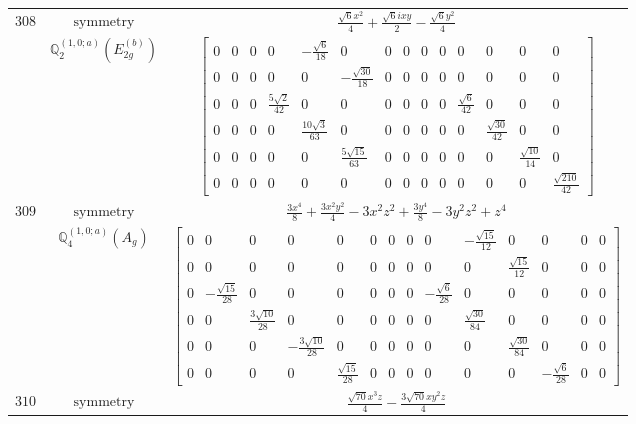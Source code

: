 \documentclass[fleqn,8pt,landscape]{jsarticle}
\begin{document}
\begin{longtable}{ccc}
$ 308 $ & $ \text{symmetry} $ & $ \frac{\sqrt{6} x^{2}}{4} + \frac{\sqrt{6} i x y}{2} - \frac{\sqrt{6} y^{2}}{4} $ \\
$  $ & $ \mathbb{Q}_{2}^{(1,0;a)}(E_{2g}^{(b)}) $ & $ \begin{bmatrix} 0 & 0 & 0 & 0 & - \frac{\sqrt{6}}{18} & 0 & 0 & 0 & 0 & 0 & 0 & 0 & 0 & 0 \\ 0 & 0 & 0 & 0 & 0 & - \frac{\sqrt{30}}{18} & 0 & 0 & 0 & 0 & 0 & 0 & 0 & 0 \\ 0 & 0 & 0 & \frac{5 \sqrt{2}}{42} & 0 & 0 & 0 & 0 & 0 & 0 & \frac{\sqrt{6}}{42} & 0 & 0 & 0 \\ 0 & 0 & 0 & 0 & \frac{10 \sqrt{3}}{63} & 0 & 0 & 0 & 0 & 0 & 0 & \frac{\sqrt{30}}{42} & 0 & 0 \\ 0 & 0 & 0 & 0 & 0 & \frac{5 \sqrt{15}}{63} & 0 & 0 & 0 & 0 & 0 & 0 & \frac{\sqrt{10}}{14} & 0 \\ 0 & 0 & 0 & 0 & 0 & 0 & 0 & 0 & 0 & 0 & 0 & 0 & 0 & \frac{\sqrt{210}}{42} \end{bmatrix} $ \\ \hline
$ 309 $ & $ \text{symmetry} $ & $ \frac{3 x^{4}}{8} + \frac{3 x^{2} y^{2}}{4} - 3 x^{2} z^{2} + \frac{3 y^{4}}{8} - 3 y^{2} z^{2} + z^{4} $ \\
$  $ & $ \mathbb{Q}_{4}^{(1,0;a)}(A_{g}) $ & $ \begin{bmatrix} 0 & 0 & 0 & 0 & 0 & 0 & 0 & 0 & 0 & - \frac{\sqrt{15}}{12} & 0 & 0 & 0 & 0 \\ 0 & 0 & 0 & 0 & 0 & 0 & 0 & 0 & 0 & 0 & \frac{\sqrt{15}}{12} & 0 & 0 & 0 \\ 0 & - \frac{\sqrt{15}}{28} & 0 & 0 & 0 & 0 & 0 & 0 & - \frac{\sqrt{6}}{28} & 0 & 0 & 0 & 0 & 0 \\ 0 & 0 & \frac{3 \sqrt{10}}{28} & 0 & 0 & 0 & 0 & 0 & 0 & \frac{\sqrt{30}}{84} & 0 & 0 & 0 & 0 \\ 0 & 0 & 0 & - \frac{3 \sqrt{10}}{28} & 0 & 0 & 0 & 0 & 0 & 0 & \frac{\sqrt{30}}{84} & 0 & 0 & 0 \\ 0 & 0 & 0 & 0 & \frac{\sqrt{15}}{28} & 0 & 0 & 0 & 0 & 0 & 0 & - \frac{\sqrt{6}}{28} & 0 & 0 \end{bmatrix} $ \\ \hline
$ 310 $ & $ \text{symmetry} $ & $ \frac{\sqrt{70} x^{3} z}{4} - \frac{3 \sqrt{70} x y^{2} z}{4} $ \\

\end{longtable}
\end{document}
